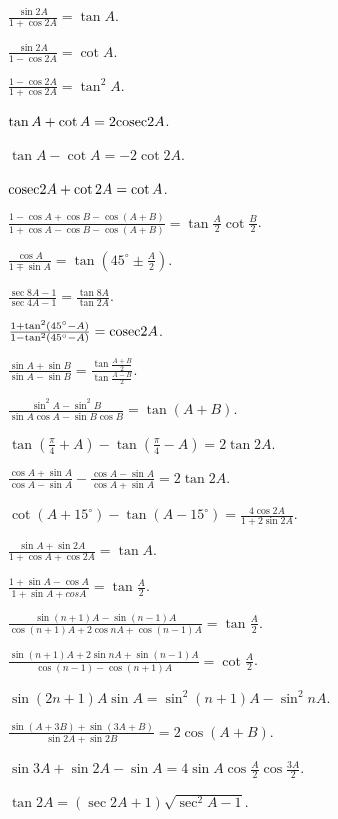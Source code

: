 \item $\frac{\sin 2A}{1 + \cos 2A} = \tan A$.
\item $\frac{\sin 2A}{1 - \cos 2A} = \cot A$.
\item $\frac{1 - \cos 2A}{1 + \cos 2A} = \tan^2A$.
\item $\tan A + \cot A = 2{\rm cosec} 2A$.
\item $\tan A - \cot A = -2\cot2A$.
\item ${\rm cosec} 2A + \cot 2A = \cot A$.
\item $\frac{1 - \cos A + \cos B - \cos(A + B)}{1 + \cos A - \cos B - \cos(A + B)} = \tan\frac{A}{2}\cot\frac{B}{2}$.
\item $\frac{\cos A}{1 \mp \sin A} = \tan\left(45^\circ \pm \frac{A}{2}\right)$.
\item $\frac{\sec 8A - 1}{\sec 4A - 1} = \frac{\tan 8A}{\tan 2A}$.
\item $\frac{1 + \tan^2(45^\circ - A)}{1 - \tan^2(45^\circ - A)} = {\rm cosec} 2A$.
\item $\frac{\sin A + \sin B}{\sin A - \sin B} = \frac{\tan \frac{A + B}{2}}{\tan \frac{A - B}{2}}$.
\item $\frac{\sin^2A - \sin^2B}{\sin A\cos A - \sin B\cos B} = \tan(A + B)$.
\item $\tan\left(\frac{\pi}{4} + A\right) - \tan\left(\frac{\pi}{4} - A\right) = 2\tan 2A$.
\item $\frac{\cos A + \sin A}{\cos A - \sin A} - \frac{\cos A - \sin A}{\cos A + \sin A} = 2\tan 2A$.
\item $\cot (A + 15^\circ) - \tan(A - 15^\circ) = \frac{4\cos 2A}{1 + 2\sin 2A}$.
\item $\frac{\sin A + \sin2A}{1 + \cos A + \cos 2A} = \tan A$.
\item $\frac{1 + \sin A - \cos A }{1 + \sin A + cos A} = \tan \frac{A}{2}$.
\item $\frac{\sin(n + 1)A - \sin(n - 1)A}{\cos(n + 1)A + 2\cos nA + \cos(n - 1)A} = \tan \frac{A}{2}$.
\item $\frac{\sin(n + 1)A + 2\sin nA + \sin(n - 1)A}{\cos(n - 1) - \cos(n + 1)A} = \cot \frac{A}{2}$.
\item $\sin(2n + 1)A\sin A = \sin^2(n + 1)A - \sin^2nA$.
\item $\frac{\sin(A + 3B) + \sin(3A + B)}{\sin 2A + \sin 2B} = 2\cos(A + B)$.
\item $\sin 3A + \sin 2A - \sin A = 4\sin A\cos \frac{A}{2}\cos \frac{3A}{2}$.
\item $\tan 2A = (\sec 2A + 1)\sqrt{\sec^2A - 1}$.
